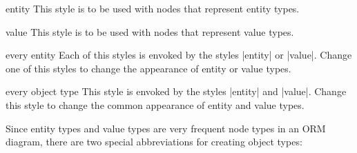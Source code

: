 \documentclass[a4paper,10pt]{article}
\begin{document}
\begin{stylekey}{entity}
This style is to be used with nodes that represent entity types.
\begin{codeexample}[]
\end{codeexample}
\end{stylekey}

\begin{stylekey}{value}
This style is to be used with nodes that represent value types.
\begin{codeexample}[]
\end{codeexample}
\end{stylekey}

\begin{stylekey}{every entity}
Each of this styles is envoked by the styles |entity| or |value|. Change one of this styles to change the appearance of entity or value types.
\begin{codeexample}[width=3cm]
\end{codeexample}
\end{stylekey}

\begin{stylekey}{every object type}
  This style is envoked by the styles |entity| and |value|. Change this style to change the common appearance of entity and value types.
\begin{codeexample}[width=3cm]
\end{codeexample}
\end{stylekey}

\noindent
Since entity types and value types are very frequent node types in an ORM diagram, there are two special abbreviations for creating object types:
\end{document}
